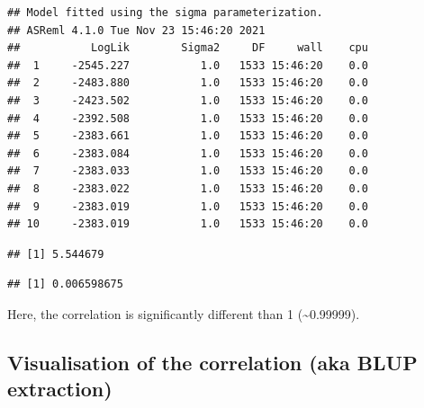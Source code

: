 \documentclass[
  12pt,
]{book}
\newenvironment{Shaded}{\begin{snugshade}}{\end{snugshade}}
\newcommand{\DataTypeTok}[1]{\textcolor[rgb]{0.13,0.29,0.53}{#1}}
\newcommand{\DecValTok}[1]{\textcolor[rgb]{0.00,0.00,0.81}{#1}}
\newcommand{\FloatTok}[1]{\textcolor[rgb]{0.00,0.00,0.81}{#1}}
\newcommand{\KeywordTok}[1]{\textcolor[rgb]{0.13,0.29,0.53}{\textbf{#1}}}
\newcommand{\NormalTok}[1]{#1}
\newcommand{\OperatorTok}[1]{\textcolor[rgb]{0.81,0.36,0.00}{\textbf{#1}}}
\newcommand{\StringTok}[1]{\textcolor[rgb]{0.31,0.60,0.02}{#1}}
\begin{document}
\begin{verbatim}
## Model fitted using the sigma parameterization.
## ASReml 4.1.0 Tue Nov 23 15:46:20 2021
##           LogLik        Sigma2     DF     wall    cpu
##  1     -2545.227           1.0   1533 15:46:20    0.0
##  2     -2483.880           1.0   1533 15:46:20    0.0
##  3     -2423.502           1.0   1533 15:46:20    0.0
##  4     -2392.508           1.0   1533 15:46:20    0.0
##  5     -2383.661           1.0   1533 15:46:20    0.0
##  6     -2383.084           1.0   1533 15:46:20    0.0
##  7     -2383.033           1.0   1533 15:46:20    0.0
##  8     -2383.022           1.0   1533 15:46:20    0.0
##  9     -2383.019           1.0   1533 15:46:20    0.0
## 10     -2383.019           1.0   1533 15:46:20    0.0
\end{verbatim}

\begin{Shaded}
\end{Shaded}

\begin{verbatim}
## [1] 5.544679
\end{verbatim}

\begin{Shaded}
\end{Shaded}

\begin{verbatim}
## [1] 0.006598675
\end{verbatim}

Here, the correlation is significantly different than 1 (\textasciitilde0.99999).

\hypertarget{visualisation-of-the-correlation-aka-blup-extraction}{%
\subsection{Visualisation of the correlation (aka BLUP extraction)}\label{visualisation-of-the-correlation-aka-blup-extraction}}
\end{document}
